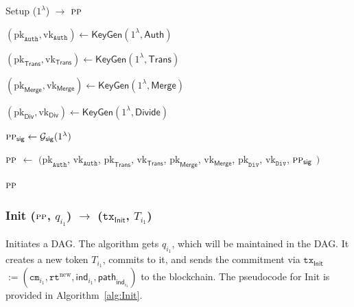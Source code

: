 \begin{algorithm}[h]
\caption{\textsf{Setup} ($1^{\lambda}$) $\rightarrow$ $\textsc{pp}$ }\label{alg:Setup}
\begin{algorithmic}

\State $(\text{pk}_\texttt{Auth}, \text{vk}_\texttt{Auth}) \leftarrow \textsf{KeyGen}(1^{\lambda}, \mathsf{Auth})$ 

\State $(\text{pk}_\textsf{Trans}, \text{vk}_\textsf{Trans}) \leftarrow \textsf{KeyGen}(1^{\lambda}, \mathsf{Trans})$ 

\State $(\text{pk}_\textsf{Merge}, \text{vk}_\textsf{Merge}) \leftarrow \textsf{KeyGen}(1^{\lambda}, \mathsf{Merge})$ 

\State $(\text{pk}_\textsf{Div}, \text{vk}_\textsf{Div}) \leftarrow \textsf{KeyGen}(1^{\lambda}, \mathsf{Divide})$ 

\State $\textsc{pp}_\mathsf{sig} \leftarrow \mathcal{G}_\mathsf{sig}(1^{\lambda})$


\State $\textsc{pp}$ $\leftarrow$ $($$\text{pk}_\texttt{Auth}$, $\text{vk}_\texttt{Auth}$, $\text{pk}_\textsf{Trans}$, $\text{vk}_\textsf{Trans}$, $\text{pk}_\textsf{Merge}$, $\text{vk}_\textsf{Merge}$, $\text{pk}_\texttt{Div}$, $\text{vk}_\texttt{Div}$, $\textsc{pp}_\mathsf{sig}$ $)$

\State \Return $\textsc{pp}$

\end{algorithmic}
\end{algorithm}

\newpage

\subsubsection{\textsf{Init} ($\textsc{pp}$, $q_{i_1}$) $\rightarrow$ ($\texttt{tx}_{\textsf{Init}}$, $T_{i_1}$) }
Initiates a DAG. The algorithm gets $q_{i_1}$, which will be maintained in the DAG. It creates a new token $T_{i_1}$, commits to it, and sends the commitment via $\texttt{tx}_{\mathsf{Init}}$$ := (\texttt{cm}_{i_1}, \texttt{rt}^{\text{new}}, \mathsf{ind}_{i_1}, \mathsf{path}_{\mathsf{ind}_{i_1}})$ to the blockchain. The pseudocode for \textsf{Init} is provided in Algorithm~\ref{alg:Init}.

